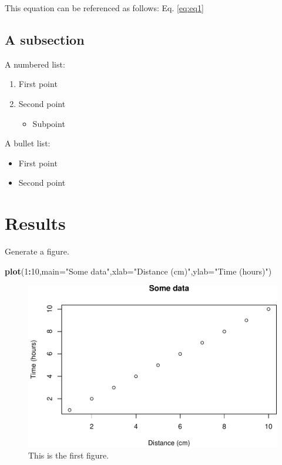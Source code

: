 \documentclass[12pt,halfline,a4paper,]{ouparticle}
\newenvironment{Shaded}{\begin{snugshade}}{\end{snugshade}}
\newcommand{\DataTypeTok}[1]{\textcolor[rgb]{0.13,0.29,0.53}{#1}}
\newcommand{\DecValTok}[1]{\textcolor[rgb]{0.00,0.00,0.81}{#1}}
\newcommand{\KeywordTok}[1]{\textcolor[rgb]{0.13,0.29,0.53}{\textbf{#1}}}
\newcommand{\NormalTok}[1]{#1}
\newcommand{\OperatorTok}[1]{\textcolor[rgb]{0.81,0.36,0.00}{\textbf{#1}}}
\newcommand{\StringTok}[1]{\textcolor[rgb]{0.31,0.60,0.02}{#1}}
\providecommand{\tightlist}{%
  \setlength{\itemsep}{0pt}\setlength{\parskip}{0pt}}
\begin{document}
This equation can be referenced as follows: Eq. \ref{eq:eq1}

\hypertarget{a-subsection}{%
\subsection{A subsection}\label{a-subsection}}

A numbered list:

\begin{enumerate}
\def\labelenumi{\arabic{enumi})}
\tightlist
\item
  First point
\item
  Second point

  \begin{itemize}
  \tightlist
  \item
    Subpoint
  \end{itemize}
\end{enumerate}

A bullet list:

\begin{itemize}
\tightlist
\item
  First point
\item
  Second point
\end{itemize}

\hypertarget{results}{%
\section{Results}\label{results}}

Generate a figure.

\begin{Shaded}
\begin{Highlighting}[]
\KeywordTok{plot}\NormalTok{(}\DecValTok{1}\OperatorTok{:}\DecValTok{10}\NormalTok{,}\DataTypeTok{main=}\StringTok{"Some data"}\NormalTok{,}\DataTypeTok{xlab=}\StringTok{"Distance (cm)"}\NormalTok{,}\DataTypeTok{ylab=}\StringTok{"Time (hours)"}\NormalTok{)}
\end{Highlighting}
\end{Shaded}

\begin{figure}[p]
\includegraphics[width=1\linewidth]{sigminer-paper_files/figure-latex/fig1-1} \caption{This is the first figure.}\label{fig:fig1}
\end{figure}
\end{document}
